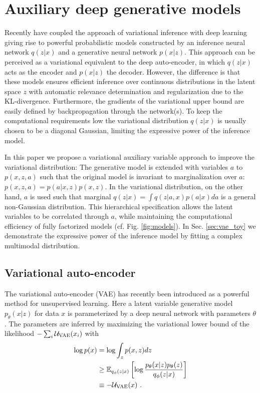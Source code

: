 \documentclass{article}
\begin{document}
\section{Auxiliary deep generative models}
Recently \citet{Kingma13,Rezende14} have coupled the approach of variational inference with deep learning giving rise to powerful probabilistic models constructed by an inference neural network $q(z|x)$ and a generative neural network $p(x|z)$. This approach can be perceived as a variational equivalent to the deep auto-encoder, in which $q(z|x)$ acts as the encoder and $p(x|z)$ the decoder. However, the difference is that these models ensures efficient inference over continuous distributions in the latent space $z$ with automatic relevance determination and regularization due to the KL-divergence. Furthermore, the gradients of the variational upper bound are easily defined by backpropagation  through the network(s). To keep the computational requirements low the variational distribution $q(z|x)$ is usually chosen to be a diagonal Gaussian, limiting the expressive power of the inference model.

In this paper we propose a variational auxiliary variable approach \cite{Agakov04} to improve the variational distribution: The generative model is extended with variables $a$ to $p(x,z,a)$ such that the original model is invariant to marginalization over $a$: $p(x,z,a)=p(a|x,z)p(x,z)$. In the variational distribution, on the other hand, $a$ is used such that marginal $q(z|x)= \int q(z|a,x)p(a|x)da$ is a general non-Gaussian distribution. This hierarchical specification allows the latent variables to be correlated through $a$, while maintaining the computational efficiency of fully factorized models (cf. Fig. \ref{fig:models}). In Sec. \ref{sec:vae_toy} we demonstrate the expressive power of the inference model by fitting a complex multimodal distribution.

\subsection{Variational auto-encoder}
The variational auto-encoder (VAE) has recently been introduced as a powerful method for unsupervised learning. Here a latent variable generative model $p_\theta(x|z)$ for data $x$ is parameterized by a deep neural network with parameters $\theta$. The parameters are inferred by maximizing the variational lower bound of the likelihood $-\sum_i {\cal U_\text{VAE}}(x_i)$ with 
\begin{align}\label{eq:vae_bound}
\log p(x) &= \log \int_z p(x,z) dz \nonumber \\
&\ge\mathbb{E}_{q_\phi(z|x)}
\left[ \log
\frac{p_\theta(x|z)p_\theta(z)}{q_\phi(z|x)} 
\right] \\
&\equiv - {\cal U}_\text{VAE}(x) \ . \nonumber
\end{align}
\end{document}
